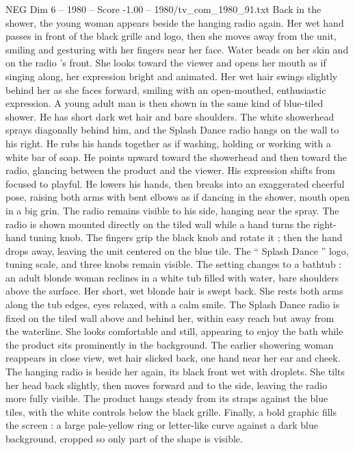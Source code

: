 \begin{textsample}{NEG Dim 6 – 1980 – Score -1.00 – 1980/tv\_com\_1980\_91.txt}
Back in the shower, the young woman appears beside the hanging radio again.
Her wet hand passes in front of the black grille and logo, then she moves away from the unit, smiling and gesturing with her fingers near her face.
Water beads on her skin and on the radio ’s front.
She looks toward the viewer and opens her mouth as if singing along, her expression bright and animated.
Her wet hair swings slightly behind her as she faces forward, smiling with an open-mouthed, enthusiastic expression.
A young adult man is then shown in the same kind of blue-tiled shower.
He has short dark wet hair and bare shoulders.
The white showerhead sprays diagonally behind him, and the Splash Dance radio hangs on the wall to his right.
He rubs his hands together as if washing, holding or working with a white bar of soap.
He points upward toward the showerhead and then toward the radio, glancing between the product and the viewer.
His expression shifts from focused to playful.
He lowers his hands, then breaks into an exaggerated cheerful pose, raising both arms with bent elbows as if dancing in the shower, mouth open in a big grin.
The radio remains visible to his side, hanging near the spray.
The radio is shown mounted directly on the tiled wall while a hand turns the right-hand tuning knob.
The fingers grip the black knob and rotate it ; then the hand drops away, leaving the unit centered on the blue tile.
The “ Splash Dance ” logo, tuning scale, and three knobs remain visible.
The setting changes to a bathtub : an adult blonde woman reclines in a white tub filled with water, bare shoulders above the surface.
Her short, wet blonde hair is swept back.
She rests both arms along the tub edges, eyes relaxed, with a calm smile.
The Splash Dance radio is fixed on the tiled wall above and behind her, within easy reach but away from the waterline.
She looks comfortable and still, appearing to enjoy the bath while the product sits prominently in the background.
The earlier showering woman reappears in close view, wet hair slicked back, one hand near her ear and cheek.
The hanging radio is beside her again, its black front wet with droplets.
She tilts her head back slightly, then moves forward and to the side, leaving the radio more fully visible.
The product hangs steady from its straps against the blue tiles, with the white controls below the black grille.
Finally, a bold graphic fills the screen : a large pale-yellow ring or letter-like curve against a dark blue background, cropped so only part of the shape is visible.

\end{textsample}
